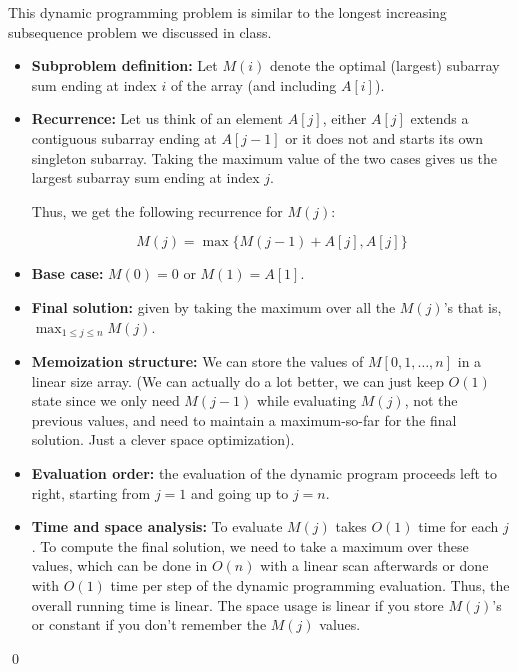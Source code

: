 \documentclass[12pt]{article}
\theoremstyle{definition}
\newenvironment{solution}{\bigskip\noindent{\it Solution.}  \ignorespaces}{\hfill\qed}
\begin{document}
\begin{solution}
This dynamic programming problem is similar to the longest increasing subsequence problem we discussed in class.

\begin{itemize}
    \item {\bf Subproblem definition:} Let $M(i)$ denote the optimal (largest) subarray sum ending at index $i$ of the array (and including $A[i]$).
    
    \item {\bf Recurrence:}  Let us think of an element $A[j]$, either $A[j]$ extends a contiguous subarray ending at $A[j-1]$ or it does not and starts its own singleton subarray.  Taking the maximum value of the two cases gives us the largest subarray sum ending at index $j$.  
    
    Thus, we get the following recurrence for $M(j)$:
    
    \[M(j) = \max\{M(j-1) + A[j], A[j]\}\]
    
    \item {\bf Base case:} $M(0) = 0$ or $M(1) = A[1]$.

    \item {\bf Final solution:} given by taking the maximum over all the $M(j)$'s that is, $\max_{1 \leq j \leq n} M(j)$.
    
    
    
    \item {\bf Memoization structure:}  We can store the values of $M[0, 1, \ldots, n]$ in a linear size array. (We can actually do a lot better, we can just keep $O(1)$ state since we only need $M(j-1)$ while evaluating $M(j)$, not the previous values, and need to maintain a maximum-so-far for the final solution.  Just a clever space optimization).  
    \item {\bf Evaluation order:} the evaluation of the dynamic program proceeds left to right, starting from $j = 1$ and going up to $j = n$.
    
    \item {\bf Time and space analysis:}  To evaluate $M(j)$ takes $O(1)$ time for each $j$.  To compute the final solution, we need to take a maximum over these values, which can be done in $O(n)$ with a linear scan afterwards or done with $O(1)$ time per step of the dynamic programming evaluation.  Thus, the overall running time is linear.  The space usage is linear if you store $M(j)$'s or constant if you don't remember the $M(j)$ values.  
\end{itemize}
\end{solution}
\end{document}
